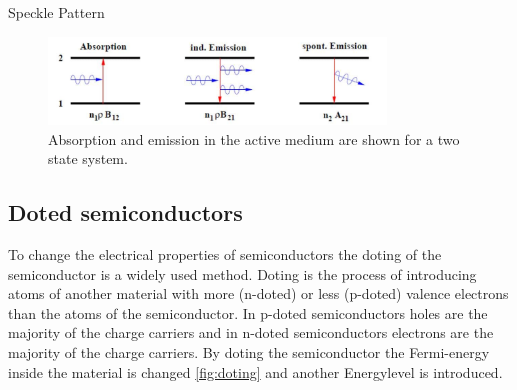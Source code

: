 Speckle Pattern \cite{speckle}

\begin{figure}
    \center
    \includegraphics[width=0.8\textwidth]{bilder/emission.jpg}
    \caption{Absorption and emission in the active medium are shown for a two state system. \cite{anleitungHeNe}}
    \label{fig:emission}
\end{figure}

\subsection{Doted semiconductors}
\label{sec:doting}
To change the electrical properties of semiconductors the doting of the semiconductor is a widely used method.
Doting is the process of introducing atoms of another material with more (n-doted) or less (p-doted) valence electrons than the atoms of the semiconductor.
In p-doted semiconductors holes are the majority of the charge carriers and in n-doted semiconductors electrons are the majority of the charge carriers.
By doting the semiconductor the Fermi-energy inside the material is changed \ref{fig:doting} and another Energylevel is introduced.


